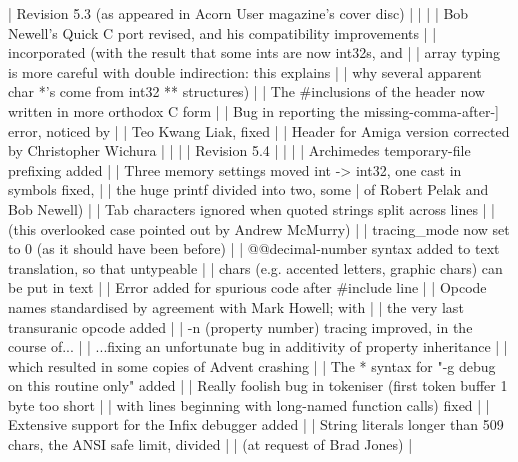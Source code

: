 |     Revision 5.3 (as appeared in Acorn User magazine's cover disc)        |
|                                                                           |
|     Bob Newell's Quick C port revised, and his compatibility improvements |
|       incorporated (with the result that some ints are now int32s, and    |
|       array typing is more careful with double indirection: this explains |
|       why several apparent char *'s come from int32 ** structures)        |
|     The #inclusions of the header now written in more orthodox C form     |
|     Bug in reporting the missing-comma-after-] error, noticed by          |
|       Teo Kwang Liak, fixed                                               |
|     Header for Amiga version corrected by Christopher Wichura             |
|                                                                           |
|     Revision 5.4                                                          |
|                                                                           |
|     Archimedes temporary-file prefixing added                             |
|     Three memory settings moved int -> int32, one cast in symbols fixed,  |
|       the huge printf divided into two, some %
|       of Robert Pelak and Bob Newell)                                     |
|     Tab characters ignored when quoted strings split across lines         |
|       (this overlooked case pointed out by Andrew McMurry)                |
|     tracing_mode now set to 0 (as it should have been before)             |
|     @@decimal-number syntax added to text translation, so that untypeable |
|       chars (e.g. accented letters, graphic chars) can be put in text     |
|     Error added for spurious code after #include line                     |
|     Opcode names standardised by agreement with Mark Howell; with         |
|       the very last transuranic opcode added                              |
|     -n (property number) tracing improved, in the course of...            |
|     ...fixing an unfortunate bug in additivity of property inheritance    |
|       which resulted in some copies of Advent crashing                    |
|     The * syntax for "-g debug on this routine only" added                |
|     Really foolish bug in tokeniser (first token buffer 1 byte too short  |
|       with lines beginning with long-named function calls) fixed          |
|     Extensive support for the Infix debugger added                        |
|     String literals longer than 509 chars, the ANSI safe limit, divided   |
|       (at request of Brad Jones)                                          |

